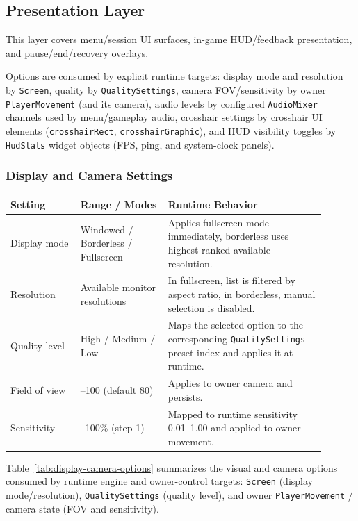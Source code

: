 \subsection*{Presentation Layer}
This layer covers menu/session UI surfaces, in-game HUD/feedback presentation, and pause/end/recovery overlays.

Options are consumed by explicit runtime targets: display mode and resolution by \texttt{Screen}, quality by \texttt{QualitySettings}, camera FOV/sensitivity by owner \texttt{PlayerMovement} (and its camera), audio levels by configured \texttt{AudioMixer} channels used by menu/gameplay audio, crosshair settings by crosshair UI elements (\texttt{crosshairRect}, \texttt{crosshairGraphic}), and HUD visibility toggles by \texttt{HudStats} widget objects (FPS, ping, and system-clock panels).

\subsubsection*{Display and Camera Settings}
\begin{table}[H]
\centering
\caption{Display and Camera Options}
\label{tab:display-camera-options}
\begin{longtable}{|>{\centering\arraybackslash}m{0.2\linewidth}|>{\centering\arraybackslash}m{0.25\linewidth}|>{\centering\arraybackslash}m{0.45\linewidth}|}
\hline
\hline
\textbf{Setting} & \textbf{Range / Modes} & \textbf{Runtime Behavior} \\
\hline
Display mode & Windowed / Borderless / Fullscreen & Applies fullscreen mode immediately, borderless uses highest-ranked available resolution. \\
\hline
Resolution & Available monitor resolutions & In fullscreen, list is filtered by aspect ratio, in borderless, manual selection is disabled. \\
\hline
Quality level & High / Medium / Low & Maps the selected option to the corresponding \texttt{QualitySettings} preset index and applies it at runtime. \\
\hline
Field of view & 60--100 (default 80) & Applies to owner camera and persists. \\
\hline
Sensitivity & 1--100\% (step 1) & Mapped to runtime sensitivity 0.01--1.00 and applied to owner movement. \\
\hline
\end{longtable}
\addtocounter{table}{-1}
\end{table}

Table~\ref{tab:display-camera-options} summarizes the visual and camera options consumed by runtime engine and owner-control targets: \texttt{Screen} (display mode/resolution), \texttt{QualitySettings} (quality level), and owner \texttt{PlayerMovement} / camera state (FOV and sensitivity).

